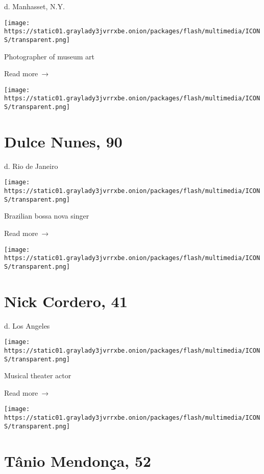 d. Manhasset, N.Y.

\texttt{[image: https://static01.graylady3jvrrxbe.onion/packages/flash/multimedia/ICONS/transparent.png]}

Photographer of museum art

 Read more~→

\href{https://www.nytimes3xbfgragh.onion/2020/07/06/arts/dulce-nunes-dead-coronavirus.html}{}

\texttt{[image: https://static01.graylady3jvrrxbe.onion/packages/flash/multimedia/ICONS/transparent.png]}

\hypertarget{dulce-nunes-90}{%
\section{Dulce Nunes, 90}\label{dulce-nunes-90}}

d. Rio de Janeiro

\texttt{[image: https://static01.graylady3jvrrxbe.onion/packages/flash/multimedia/ICONS/transparent.png]}

Brazilian bossa nova singer

 Read more~→

\href{https://www.nytimes3xbfgragh.onion/2020/07/05/obituaries/nick-cordero-dead-coronavirus.html}{}

\texttt{[image: https://static01.graylady3jvrrxbe.onion/packages/flash/multimedia/ICONS/transparent.png]}

\hypertarget{nick-cordero-41}{%
\section{Nick Cordero, 41}\label{nick-cordero-41}}

d. Los Angeles

\texttt{[image: https://static01.graylady3jvrrxbe.onion/packages/flash/multimedia/ICONS/transparent.png]}

Musical theater actor

 Read more~→

\href{https://www.nytimes3xbfgragh.onion/2020/07/03/obituaries/tanio-mendonca-dead-coronavirus.html}{}

\texttt{[image: https://static01.graylady3jvrrxbe.onion/packages/flash/multimedia/ICONS/transparent.png]}

\hypertarget{tuxe2nio-mendonuxe7a-52}{%
\section{Tânio Mendonça, 52}\label{tuxe2nio-mendonuxe7a-52}}

